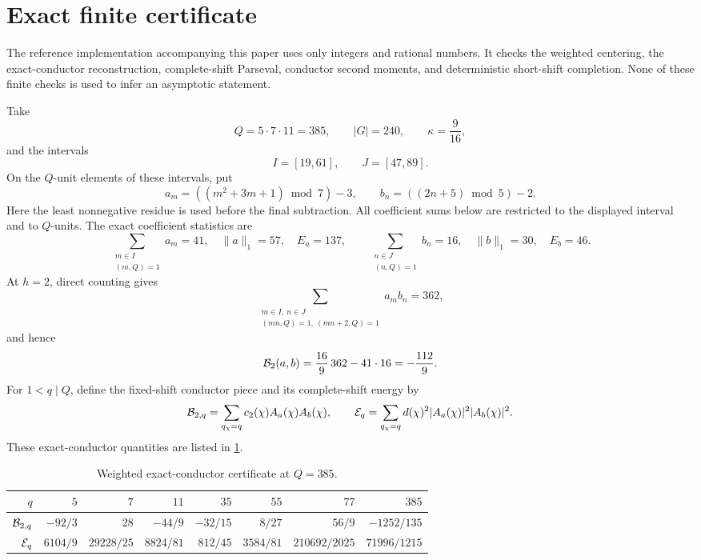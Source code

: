 \section{Exact finite certificate}\label{sec:finite-certificate}

The reference implementation accompanying this paper uses only integers and rational numbers.  It checks the weighted centering, the exact-conductor reconstruction, complete-shift Parseval, conductor second moments, and deterministic short-shift completion.  None of these finite checks is used to infer an asymptotic statement.

Take
\[
 Q=5\cdot7\cdot11=385,
 \qquad
 |G|=240,
 \qquad
 \kappa=\frac9{16},
\]
and the intervals
\[
 I=[19,61],
 \qquad
 J=[47,89].
\]
On the $Q$-unit elements of these intervals, put
\[
 a_m=((m^2+3m+1)\bmod 7)-3,
 \qquad
 b_n=((2n+5)\bmod 5)-2.
\]
Here the least nonnegative residue is used before the final subtraction.  All
coefficient sums below are restricted to the displayed interval and to
$Q$-units.  The exact coefficient statistics are
\[
 \sum_{\substack{m\in I\\(m,Q)=1}} a_m=41,
 \quad \|a\|_1=57,
 \quad E_a=137,
 \qquad
 \sum_{\substack{n\in J\\(n,Q)=1}} b_n=16,
 \quad \|b\|_1=30,
 \quad E_b=46.
\]
At $h=2$, direct counting gives
\[
 \sum_{\substack{m\in I,\ n\in J\\
                  (mn,Q)=1,\ (mn+2,Q)=1}}a_mb_n=362,
\]
and hence
\begin{equation}\label{eq:certificate-fixed-value}
 \mathcal B_2(a,b)
 =\frac{16}{9}\,362-41\cdot16
 =-\frac{112}{9}.
\end{equation}
For $1<q\mid Q$, define the fixed-shift conductor piece and its complete-shift
energy by
\[
 \mathcal B_{2,q}
 =\sum_{q_\chi=q}c_2(\chi)A_a(\chi)A_b(\chi),
 \qquad
 \mathcal E_q
 =\sum_{q_\chi=q}d(\chi)^2|A_a(\chi)|^2|A_b(\chi)|^2.
\]
These exact-conductor quantities are listed in
\cref{tab:certificate-weighted-supports}.

\begin{table}[ht]
\centering
\caption{Weighted exact-conductor certificate at $Q=385$.}
\label{tab:certificate-weighted-supports}
\begin{tabular}{@{}rrrrrrrr@{}}
\toprule
$q$ & $5$ & $7$ & $11$ & $35$ & $55$ & $77$ & $385$\\
\midrule
$\mathcal B_{2,q}$
& $-92/3$ & $28$ & $-44/9$ & $-32/15$ & $8/27$ & $56/9$ & $-1252/135$\\
$\mathcal E_q$
& $6104/9$ & $29228/25$ & $8824/81$ & $812/45$ & $3584/81$ & $210692/2025$ & $71996/1215$\\
\bottomrule
\end{tabular}
\end{table}

